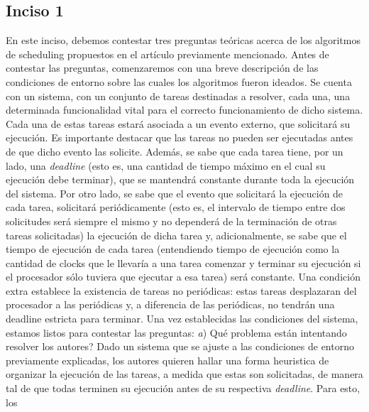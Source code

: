 \subsection*{Inciso 1}
En este inciso, debemos contestar tres preguntas te\'oricas acerca de los algoritmos de scheduling propuestos en el art\'iculo previamente mencionado. Antes de 
contestar las preguntas, comenzaremos con una breve descripci\'on de las condiciones de entorno sobre las cuales los algoritmos fueron ideados.
\newline
\newline
Se cuenta con un sistema, con un conjunto de tareas destinadas a resolver, cada una, una determinada funcionalidad vital para el correcto funcionamiento
de dicho sistema. Cada una de estas tareas estar\'a asociada a un evento externo, que solicitar\'a su ejecuci\'on. Es importante destacar que las tareas no
pueden ser ejecutadas antes de que dicho evento las solicite. Adem\'as, se sabe que cada tarea tiene, por un lado, una \textit{deadline} (esto es, una cantidad
de tiempo m\'aximo en el cual su ejecuci\'on debe terminar), que se mantendr\'a constante durante toda la ejecuci\'on del sistema. Por otro lado, se sabe
que el evento que solicitar\'a la ejecuci\'on de cada tarea, solicitar\'a peri\'odicamente (esto es, el intervalo de tiempo entre dos solicitudes ser\'a
siempre el mismo y no depender\'a de la terminaci\'on de otras tareas solicitadas) la ejecuci\'on de dicha tarea y, adicionalmente, se sabe que el tiempo de 
ejecuci\'on de cada tarea (entendiendo tiempo de ejecuci\'on como la cantidad de clocks que le llevar\'ia a una tarea comenzar y terminar su ejecuci\'on si el 
procesador s\'olo tuviera que ejecutar a esa tarea) ser\'a constante. Una condici\'on extra establece la existencia de tareas no peri\'odicas: estas tareas
desplazaran del procesador a las peri\'odicas y, a diferencia de las peri\'odicas, no tendr\'an una deadline estricta para terminar. Una vez establecidas
las condiciones del sistema, estamos listos para contestar las preguntas:
\newline
\newline
\textit{a}) \textquestiondown Qu\'e problema est\'an intentando resolver los autores?
\newline
\newline
Dado un sistema que se ajuste a las condiciones de entorno previamente explicadas, los autores quieren hallar una forma heuristica de organizar la ejecuci\'on de las
tareas, a medida que estas son solicitadas, de manera tal de que todas terminen su ejecuci\'on antes de su respectiva \textit{deadline}. Para esto, los 
